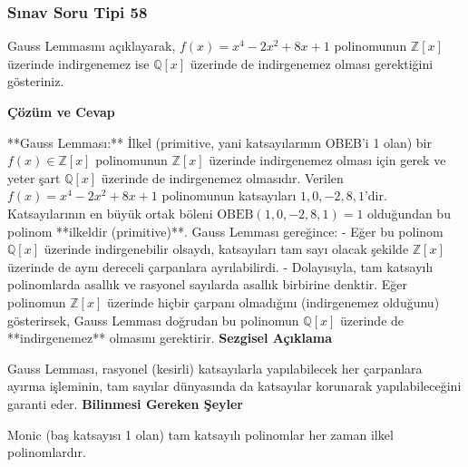 \documentclass[11pt, a4paper]{article}
\newenvironment{cozum}{
    \vspace{0.5cm}
    \noindent\textcolor{green!60!black}{\faCheckCircle\enspace \textbf{\Large Çözüm ve Cevap}}\par\vspace{0.2cm}
}{}
\newenvironment{sezgisel}{
    \vspace{0.5cm}
    \noindent\textcolor{orange!80!black}{\faLightbulb\enspace \textbf{\Large Sezgisel Açıklama}}\par\vspace{0.2cm}
    \itshape
}{}
\newenvironment{bilgi}{
    \vspace{0.5cm}
    \noindent\textcolor{red!70!black}{\faExclamationTriangle\enspace \textbf{\Large Bilinmesi Gereken Şeyler}}\par\vspace{0.2cm}
}{}
\begin{document}
\subsubsection{Sınav Soru Tipi 58}
\begin{sinavbox}
Gauss Lemmasını açıklayarak, $f(x) = x^4-2x^2+8x+1$ polinomunun $\mathbb{Z}[x]$ üzerinde indirgenemez ise $\mathbb{Q}[x]$ üzerinde de indirgenemez olması gerektiğini gösteriniz.
\end{sinavbox}
\begin{cozum}
**Gauss Lemması:** İlkel (primitive, yani katsayılarının OBEB'i 1 olan) bir $f(x) \in \mathbb{Z}[x]$ polinomunun $\mathbb{Z}[x]$ üzerinde indirgenemez olması için gerek ve yeter şart $\mathbb{Q}[x]$ üzerinde de indirgenemez olmasıdır.
Verilen $f(x) = x^4-2x^2+8x+1$ polinomunun katsayıları $1, 0, -2, 8, 1$'dir. Katsayılarının en büyük ortak böleni $\text{OBEB}(1, 0, -2, 8, 1) = 1$ olduğundan bu polinom **ilkeldir (primitive)**.
Gauss Lemması gereğince:
- Eğer bu polinom $\mathbb{Q}[x]$ üzerinde indirgenebilir olsaydı, katsayıları tam sayı olacak şekilde $\mathbb{Z}[x]$ üzerinde de aynı dereceli çarpanlara ayrılabilirdi.
- Dolayısıyla, tam katsayılı polinomlarda asallık ve rasyonel sayılarda asallık birbirine denktir.
Eğer polinomun $\mathbb{Z}[x]$ üzerinde hiçbir çarpanı olmadığını (indirgenemez olduğunu) gösterirsek, Gauss Lemması doğrudan bu polinomun $\mathbb{Q}[x]$ üzerinde de **indirgenemez** olmasını gerektirir.
\end{cozum}
\begin{sezgisel}
Gauss Lemması, rasyonel (kesirli) katsayılarla yapılabilecek her çarpanlara ayırma işleminin, tam sayılar dünyasında da katsayılar korunarak yapılabileceğini garanti eder.
\end{sezgisel}
\begin{bilgi}
Monic (baş katsayısı 1 olan) tam katsayılı polinomlar her zaman ilkel polinomlardır.
\end{bilgi}

\newpage
\end{document}
